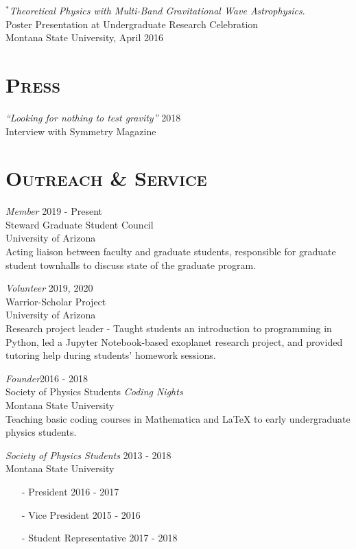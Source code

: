 \documentclass[margin]{res}
\begin{document}
\begin{resume}
\emph{$^{*}$Theoretical Physics with Multi-Band Gravitational Wave Astrophysics}. \\
Poster Presentation at Undergraduate Research Celebration\\  Montana State University, April 2016
\bigskip


\section{\textsc{Press}}
{\sl ``Looking for nothing to test gravity''} \hfill 2018\\
Interview with Symmetry Magazine

\section{\textsc{Outreach \& Service}}
{\sl Member }\hfill 2019 - Present\\
Steward Graduate Student Council\\
University of Arizona\\
{\footnotesize Acting liaison between faculty and graduate students, responsible for graduate student townhalls to discuss state of the graduate program. }

{\sl Volunteer }\hfill 2019, 2020\\
Warrior-Scholar Project\\
University of Arizona\\
{\footnotesize Research project leader - Taught students an introduction to programming in Python, led a Jupyter Notebook-based exoplanet research project, and provided tutoring help during students' homework sessions.}

{\sl Founder}\hfill 2016 - 2018\\
Society of Physics Students \emph{Coding Nights}\\
Montana State University\\
{\footnotesize Teaching basic coding courses in Mathematica and LaTeX to early undergraduate physics students.}

{\sl Society of Physics Students}  \hfill 2013 - 2018\\
Montana State University
\begin{itemize}
\item[-] President \hfill 2016 - 2017
\item[-]Vice President \hfill 2015 - 2016
\item[-]Student Representative \hfill 2017 - 2018
\end{itemize}



\end{resume}
\end{document}
